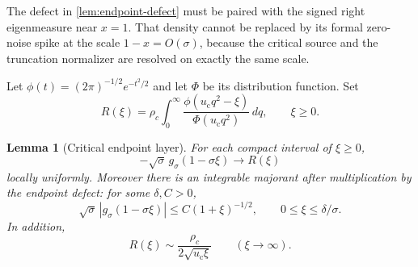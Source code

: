 \documentclass[11pt]{article}
\newtheorem{lemma}[theorem]{Lemma}
\theoremstyle{definition}
\theoremstyle{remark}
\newcommand{\uc}{u_{\mathrm c}}
\begin{document}
The defect in \cref{lem:endpoint-defect} must be paired with the signed right
eigenmeasure near $x=1$.  That density cannot be replaced by its formal
zero-noise spike at the scale $1-x=O(\sigma)$, because the critical source and
the truncation normalizer are resolved on exactly the same scale.

Let $\phi(t)=(2\pi)^{-1/2}e^{-t^2/2}$ and let $\Phi$ be its distribution
function.  Set
\begin{equation}\label{eq:R-profile}
 R(\xi)=\rho_c\int_0^\infty
 \frac{\phi(\uc q^2-\xi)}{\Phi(\uc q^2)}\,dq,
 \qquad \xi\ge0.
\end{equation}

\begin{lemma}[Critical endpoint layer]
\label{lem:endpoint-density}
For each compact interval of $\xi\ge0$,
\begin{equation}\label{eq:endpoint-density-limit}
 -\sqrt\sigma\,g_\sigma(1-\sigma\xi)
 \longrightarrow R(\xi)
\end{equation}
locally uniformly.  Moreover there is an integrable majorant after
multiplication by the endpoint defect: for some $\delta,C>0$,
\begin{equation}\label{eq:endpoint-density-majorant}
 \sqrt\sigma\,|g_\sigma(1-\sigma\xi)|
 \le C(1+\xi)^{-1/2},
 \qquad 0\le\xi\le\delta/\sigma.
\end{equation}
In addition,
\begin{equation}\label{eq:R-tail}
 R(\xi)\sim\frac{\rho_c}{2\sqrt{\uc\xi}}
 \qquad(\xi\to\infty).
\end{equation}
\end{lemma}
\end{document}
